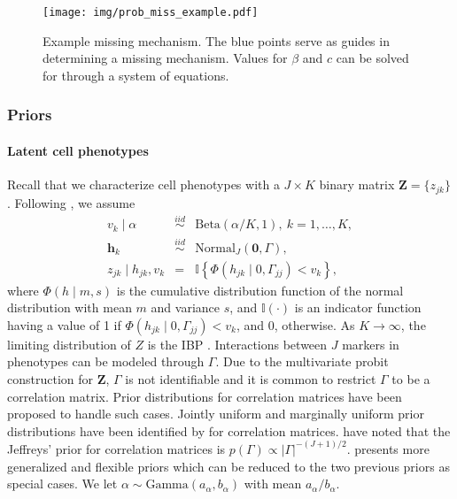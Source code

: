 \documentclass[12pt,]{article}
\newcommand{\abs}[1]{ \left|#1\right| }
\newcommand{\iid}{\overset{iid}{\sim}}
\def\h{\bm{h}}
\def\Z{\bm{Z}}
\begin{document}
\begin{figure}[th!]
\begin{center}
\texttt{[image: img/prob\_miss\_example.pdf]}
\caption{Example missing mechanism. The blue points serve as guides in
determining a missing mechanism. Values for $\beta$ and $c$ can be solved for
through a system of equations.}
\label{fig:prob-miss-eg}
\end{center}
\end{figure}



\subsubsection{Priors}\label{priors}
\paragraph*{Latent cell phenotypes}  Recall that we characterize cell phenotypes with a $J\times K$ binary matrix \(\Z =\{z_{jk}\}\).  Following \citet{williamson2010dependent}, we assume
\begin{eqnarray*}
  v_k \mid \alpha &\iid& \text{Beta}(\alpha/K, 1),~ k=1, \ldots, K, \\
  \h_k &\iid& \text{Normal}_J(\bm{0}, \Gamma), \\ 
  z_{jk} \mid h_{jk}, v_k &=& \mathbb{I}\left\{ \Phi(h_{jk} \mid 0,
  \Gamma_{jj}) < v_k \right\},
\end{eqnarray*}
where $\Phi(h \mid m, s)$ is the cumulative distribution function of the normal
distribution with mean $m$ and variance $s$, and $\mathbb{I}(\cdot)$ is an
indicator function having a value of 1 if $\Phi(h_{jk} \mid 0, \Gamma_{jj}) <
v_k$, and 0, otherwise.  As $K \rightarrow \infty$, the limiting distribution of
$Z$ is the IBP \citep{griffiths2011indian}.  Interactions between $J$ markers
in phenotypes can be modeled through $\Gamma$.  Due to the multivariate probit
construction for $\Z$, $\Gamma$ is not identifiable and it is common to
restrict $\Gamma$ to be a correlation matrix. Prior distributions for
correlation matrices have been proposed to handle such cases. Jointly uniform
and marginally uniform prior distributions have been identified by
\cite{barnard2000modeling} for correlation matrices. \cite{box2011bayesian}
have noted that the Jeffreys' prior for correlation matrices is $p(\Gamma)
\propto \abs{\Gamma}^{-(J+1)/2}$.  \cite{zhang2006sampling} presents more
generalized and flexible priors which can be reduced to the two previous priors
as special cases.
%
We let $\alpha \sim \text{Gamma}(a_\alpha, b_\alpha)$ with mean $a_\alpha/b_\alpha$.  
\end{document}
